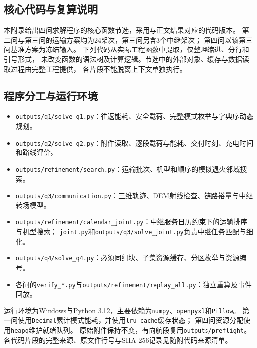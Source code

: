 \documentclass[bwprint]{gmcmthesis}
\begin{document}




\clearpage
\begin{appendices}
\renewcommand{\thesubsection}{\Alph{section}.\arabic{subsection}}
\section{核心代码与复算说明}

本附录给出四问求解程序的核心函数节选，采用与正文结果对应的代码版本。
第二问与第三问的运输方案均为24架次，第三问另含3个中继架次；
第四问以该第三问基准方案为冻结输入。
下列代码从实际工程函数中提取，仅整理缩进、分行和引号形式，
未改变函数的语法树及计算逻辑。节选中的外部对象、缓存与数据读取过程由完整工程提供，
各片段不能脱离上下文单独执行。

\subsection{程序分工与运行环境}
\begin{itemize}
  \item \texttt{outputs/q1/solve\_q1.py}：往返能耗、安全载荷、完整模式枚举与字典序动态规划。
  \item \texttt{outputs/q2/solve\_q2.py}：附件读取、逐段载荷与能耗、交付时刻、充电时间和路线评价。
  \item \texttt{outputs/refinement/search.py}：运输批次、机型和顺序的模拟退火邻域搜索。
  \item \texttt{outputs/q3/communication.py}：三维轨迹、DEM射线检查、链路裕量与中继转场模型。
  \item \texttt{outputs/refinement/calendar\_joint.py}：中继服务日历约束下的运输排序与机型搜索；
  \texttt{joint.py}和\texttt{outputs/q3/solve\_joint.py}负责中继任务匹配与细化。
  \item \texttt{outputs/q4/solve\_q4.py}：必须同组块、子集资源缓存、分区枚举与资源编号。
  \item 各问的\texttt{verify\_*.py}与\texttt{outputs/refinement/replay\_all.py}：独立重算及事件回放。
\end{itemize}

运行环境为Windows与Python 3.12，主要依赖为\texttt{numpy}、\texttt{openpyxl}和\texttt{Pillow}。
第一问使用\texttt{Decimal}累计模式能耗，并使用\texttt{lru\_cache}缓存状态；
第四问资源分配使用\texttt{heapq}维护就绪队列。
原始附件保持不变，有向航段复用\texttt{outputs/preflight}。
各代码片段的完整来源、原文件行号与SHA-256记录见随附代码来源清单。


\end{appendices}
\end{document}
